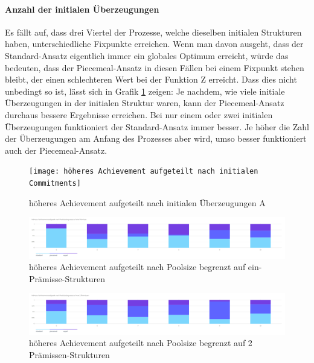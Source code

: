 \documentclass{article}
\begin{document}
\paragraph{Anzahl der initialen Überzeugungen} Es fällt auf, dass drei Viertel der Prozesse, welche dieselben initialen Strukturen haben, unterschiedliche Fixpunkte erreichen. Wenn man davon ausgeht, dass der Standard-Ansatz eigentlich immer ein globales Optimum erreicht, würde das bedeuten, dass der Piecemeal-Ansatz in diesen Fällen bei einem Fixpunkt stehen bleibt, der einen schlechteren Wert bei der Funktion Z erreicht. Dass dies nicht unbedingt so ist, lässt sich in Grafik \ref{fig:höheres Achievement aufgeteilt nach initialen Commitments} zeigen: Je nachdem, wie viele initiale Überzeugungen in der initialen Struktur waren, kann der Piecemeal-Ansatz durchaus bessere Ergebnisse erreichen. Bei nur einem oder zwei initialen Überzeugungen funktioniert der Standard-Ansatz immer besser. Je höher die Zahl der Überzeugungen am Anfang des Prozesses aber wird, umso besser funktioniert auch der Piecemeal-Ansatz.

\begin{figure}[ht]
  \centering
  \texttt{[image: höheres Achievement aufgeteilt nach initialen Commitments]}
  \caption{höheres Achievement aufgeteilt nach initialen Überzeugungen A\label{fig:höheres Achievement aufgeteilt nach initialen Commitments}}
\end{figure}

\begin{figure}[ht]
  \centering
  \includegraphics[width=\textwidth]{höheres Achievement aufgeteilt nach Poolsize begrenzt auf eine Prämisse}
  \caption{höheres Achievement aufgeteilt nach Poolsize begrenzt auf ein-Prämisse-Strukturen\label{fig:höheres Achievement aufgeteilt nach Poolsize begrenzt auf eine Prämisse}}
\end{figure}

\begin{figure}[ht]
  \centering
  \includegraphics[width=\textwidth]{höheres Achievement aufgeteilt nach Poolsize begrenzt auf max 2 Prämissen}
  \caption{höheres Achievement aufgeteilt nach Poolsize begrenzt auf 2 Prämissen-Strukturen\label{fig:höheres Achievement aufgeteilt nach Poolsize begrenzt auf max 2 Prämissen}}
\end{figure}
\end{document}
